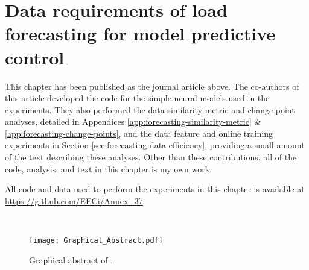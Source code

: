 
\chapter[Forecasting data requirements for \glsxtrshort{mpc}]{Data requirements of load forecasting for model predictive control} \label{chap:forecasting}

\graphicspath{{Forecasting/Figs/}}

\begin{cbox}{}

    \noindent{\color{black!50}\rule{\textwidth}{0.4mm}}\vspace{2mm}

    \noindent
    This chapter has been published as the journal article above. The co-authors of this article developed the code for the simple neural models used in the experiments. They also performed the data similarity metric and change-point analyses, detailed in Appendices \ref{app:forecasting-similarity-metric} \& \ref{app:forecasting-change-points}, and the data feature and online training experiments in Section \ref{sec:forecasting-data-efficiency}, providing a small amount of the text describing these analyses. Other than these contributions, all of the code, analysis, and text in this chapter is my own work.
\end{cbox}

\begin{cbox}{}
    All code and data used to perform the experiments in this chapter is available at \url{https://github.com/EECi/Annex_37}.
\end{cbox}

\hfill \\

\begin{figure}[h]
    \centering
    \texttt{[image: Graphical\_Abstract.pdf]}
    \caption{Graphical abstract of .}
    \label{fig:forecasting-forecasting_graphical_abstract}
\end{figure}
\hfill \\

